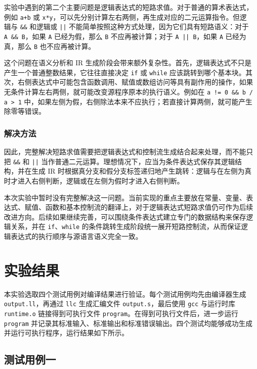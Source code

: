 \documentclass[12pt]{ctexart}
\begin{document}
实验中遇到的第二个主要问题是逻辑表达式的短路求值。对于普通的算术表达式，例如 \texttt{a+b} 或 \texttt{x*y}，可以先分别计算左右两侧，再生成对应的二元运算指令。但逻辑与 \texttt{\&\&} 和逻辑或 \texttt{||} 不能简单按照这种方式处理，因为它们具有短路语义：对于 \texttt{A \&\& B}，如果 \texttt{A} 已经为假，那么 \texttt{B} 不应再被计算；对于 \texttt{A || B}，如果 \texttt{A} 已经为真，那么 \texttt{B} 也不应再被计算。

这个问题在语义分析和 IR 生成阶段会带来额外复杂性。首先，逻辑表达式不只是产生一个普通整数结果，它往往直接决定 \texttt{if} 或 \texttt{while} 应该跳转到哪个基本块。其次，右侧表达式中可能包含函数调用、赋值或数组访问等具有副作用的操作，如果无条件计算左右两侧，就可能改变源程序原本的执行语义。例如在 \texttt{a != 0 \&\& b / a > 1} 中，如果左侧为假，右侧除法本来不应执行；若直接计算两侧，就可能产生除零等错误。

\subsubsection{解决方法}

因此，完整解决短路求值需要把逻辑表达式和控制流生成结合起来处理，而不能只把 \texttt{\&\&} 和 \texttt{||} 当作普通二元运算。理想情况下，应当为条件表达式保存其逻辑结构，并在生成 IR 时根据真分支和假分支标签递归地产生跳转：逻辑与在左侧为真时才进入右侧判断，逻辑或在左侧为假时才进入右侧判断。

本次实验中暂时没有完整解决这一问题。当前实现的重点主要放在常量、变量、表达式、赋值、函数和基本控制流的翻译上，对于逻辑表达式短路求值仍可作为后续改进方向。后续如果继续完善，可以围绕条件表达式建立专门的数据结构来保存逻辑关系，并在 \texttt{if}、\texttt{while} 的条件跳转生成阶段统一展开短路控制流，从而保证逻辑表达式的执行顺序与源语言语义完全一致。

\section{实验结果}

本实验选取四个测试用例对编译结果进行验证。每个测试用例均先由编译器生成 \texttt{output.ll}，再通过 \texttt{llc} 生成汇编文件 \texttt{output.s}，最后使用 \texttt{gcc} 与运行时库 \texttt{runtime.o} 链接得到可执行文件 \texttt{program}。在得到可执行文件后，进一步运行 \texttt{program} 并记录其标准输入、标准输出和标准错误输出。四个测试均能够成功生成并运行可执行程序，运行结果如下所示。

\subsection{测试用例一}
\end{document}
